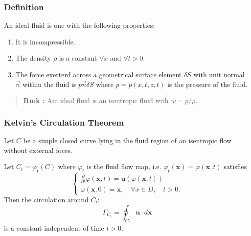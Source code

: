 \subsubsection{Definition} %

An ideal fluid is one with the following properties:

\begin{enumerate}
	\item It is incompressible.
	\item The density $\rho$ is a constant $\forall x$ and $\forall t>0$.
	\item The force exerterd across a geometrical surface element $\delta S$ with unit normal $\vec{n}$ within the fluid is $p\vec{n}\delta S$ where $p=p(x,t,z,t)$ is the pressure of the fluid.

\end{enumerate}
\begin{quote}
	\textbf{Rmk : }
Am ideal fluid is an isentropic fluid with $w = p/\rho$.
\end{quote}

\subsubsection{Kelvin's Circulation Theorem} %

Let $C$ be a simple closed curve lying in the fluid region of an isentropic flow without external foces.

Let $C_t = \varphi_t(C)$ where $\varphi_t$ is the fluid flow map, i.e. $\varphi_t(\textbf{x}) = \varphi(\textbf{x},t)$ satisfies
\begin{equation}
\begin{cases}
\displaystyle \frac{\partial}{\partial t} \varphi(\textbf{x},t)
= \textbf{u}(\varphi(\textbf{x},t))\\
\varphi(\textbf{x},0) = \textbf{x},\quad \forall x\in D,\quad t>0.
\end{cases}
\end{equation}
Then the circulation around $C_t$: 
\begin{equation}
\Gamma_{C_t} = \oint_{C_{t}} \textbf{u}\cdot d\textbf{x}
\end{equation}
is a constant independent of time $t>0$.

